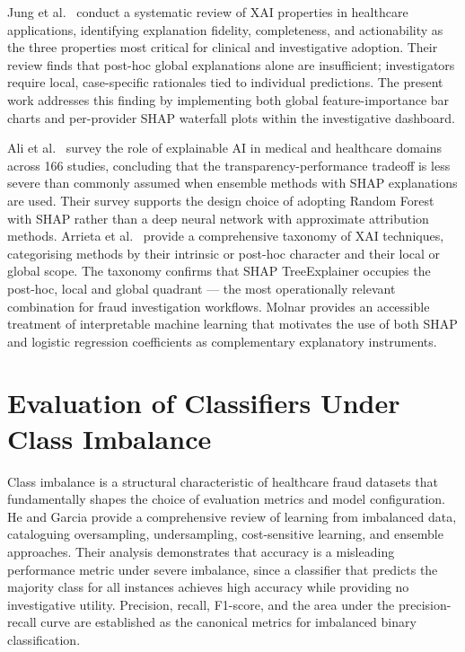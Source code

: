Jung et al.\ \cite{b7} conduct a systematic review of XAI properties in healthcare applications, identifying explanation fidelity, completeness, and actionability as the three properties most critical for clinical and investigative adoption. Their review finds that post-hoc global explanations alone are insufficient; investigators require local, case-specific rationales tied to individual predictions. The present work addresses this finding by implementing both global feature-importance bar charts and per-provider SHAP waterfall plots within the investigative dashboard.

Ali et al.\ \cite{b8} survey the role of explainable AI in medical and healthcare domains across 166 studies, concluding that the transparency-performance tradeoff is less severe than commonly assumed when ensemble methods with SHAP explanations are used. Their survey supports the design choice of adopting Random Forest with SHAP rather than a deep neural network with approximate attribution methods. Arrieta et al.\ \cite{b9} provide a comprehensive taxonomy of XAI techniques, categorising methods by their intrinsic or post-hoc character and their local or global scope. The taxonomy confirms that SHAP TreeExplainer occupies the post-hoc, local and global quadrant --- the most operationally relevant combination for fraud investigation workflows. Molnar \cite{b19} provides an accessible treatment of interpretable machine learning that motivates the use of both SHAP and logistic regression coefficients as complementary explanatory instruments.

\section{Evaluation of Classifiers Under Class Imbalance}
\label{sec:lit-imbalance}

Class imbalance is a structural characteristic of healthcare fraud datasets that fundamentally shapes the choice of evaluation metrics and model configuration. He and Garcia \cite{b10} provide a comprehensive review of learning from imbalanced data, cataloguing oversampling, undersampling, cost-sensitive learning, and ensemble approaches. Their analysis demonstrates that accuracy is a misleading performance metric under severe imbalance, since a classifier that predicts the majority class for all instances achieves high accuracy while providing no investigative utility. Precision, recall, F1-score, and the area under the precision-recall curve are established as the canonical metrics for imbalanced binary classification.


